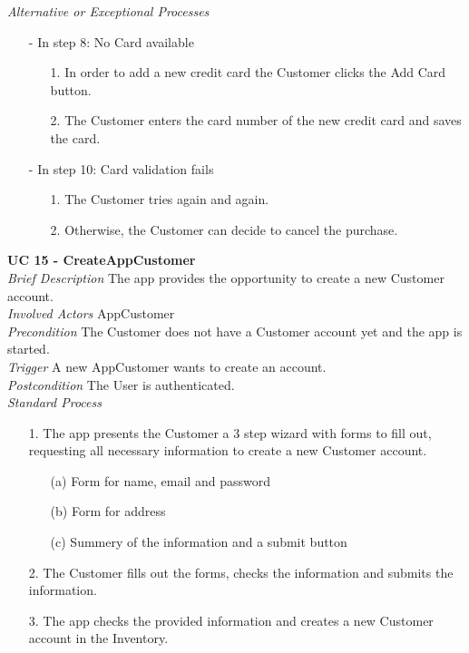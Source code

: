 \textit{Alternative or Exceptional Processes}
\begin{itemize}
	\item[-] In step 8: No Card available
	\begin{itemize}
		\item[1.] In order to add a new credit card the Customer clicks the Add Card button.
		\item[2.] The Customer enters the card number of the new credit card and saves the card.
	\end{itemize}
	
	\item[-] In step 10: Card validation fails
	\begin{itemize}
		\item[1.] The Customer tries again and again.
		\item[2.] Otherwise, the Customer can decide to cancel the purchase.
	\end{itemize}
\end{itemize}


\textbf{UC 15 - CreateAppCustomer}\\ \newline
\textit{Brief Description} The app provides the opportunity to create a new Customer account.\\ \newline
\textit{Involved Actors} AppCustomer\\ \newline
\textit{Precondition} The Customer does not have a Customer account yet and the app is started.\\ \newline
\textit{Trigger} A new AppCustomer wants to create an account.\\ \newline
\textit{Postcondition} The User is authenticated.\\ \newline
\textit{Standard Process}
\begin{itemize}[leftmargin=*]
	\item[1.] The app presents the Customer a 3 step wizard with forms to fill out, requesting all necessary information to create a new Customer account.
	\begin{itemize}
		\item[(a)] Form for name, email and password
		\item[(b)] Form for address
		\item[(c)] Summery of the information and a submit button
	\end{itemize}
	\item[2.]The Customer fills out the forms, checks the information and submits the	information.
	\item[3.] The app checks the provided information and creates a new Customer account in the Inventory.
\end{itemize}

